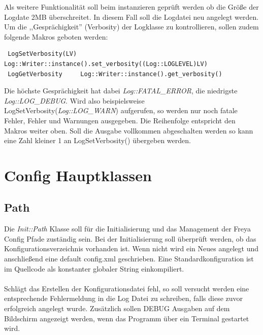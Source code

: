 Als weitere Funktionalität soll beim instanzieren geprüft werden ob die Größe der Logdate 2MB überschreitet. In diesem Fall soll die Logdatei neu angelegt werden.
Um die ,,Gesprächigkeit'' (Verbosity) der Logklasse zu kontrollieren, sollen zudem folgende Makros geboten werden:
\begin{verbatim}
 LogSetVerbosity(LV) Log::Writer::instance().set_verbosity((Log::LOGLEVEL)LV)
 LogGetVerbosity     Log::Writer::instance().get_verbosity()
\end{verbatim}
Die höchste Gesprächigkeit hat dabei \emph{Log::FATAL\_ERROR}, die niedrigste \emph{Log::LOG\_DEBUG}. Wird also beispielsweise LogSetVerbosity(\emph{Log::LOG\_WARN}) aufgerufen, so
werden nur noch fatale Fehler, Fehler und Warnungen ausgegeben. Die Reihenfolge entspricht den Makros weiter oben.
Soll die Ausgabe vollkommen abgeschalten werden so kann eine Zahl kleiner 1 an LogSetVerbosity() übergeben werden.


\section{Config Hauptklassen}

\subsection{Path}
Die \emph{Init::Path} Klasse soll für die Initialisierung und das Management der Freya Config Pfade zuständig sein.
Bei der Initialisierung soll überprüft werden, ob das Konfigurationsverzeichnis vorhanden ist. Wenn nicht wird ein Neues
angelegt und anschließend eine default config.xml geschrieben. Eine Standardkonfiguration ist im Quellcode als 
konstanter globaler String einkompiliert.
\\
\\
Schlägt das Erstellen der Konfigurationsdatei fehl, so soll versucht werden eine entsprechende Fehlermeldung in die Log Datei zu schreiben, 
falls diese zuvor erfolgreich angelegt wurde. Zusätzlich sollen DEBUG Ausgaben auf dem Bildschirm angezeigt werden, wenn das Programm
über ein Terminal gestartet wird.

